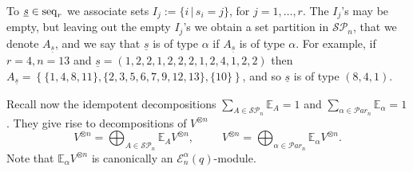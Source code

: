 \documentclass[10pt,a4,twoside,hidelinks,rm]{article}
\newcommand{\seqr}{{\rm seq}_r}
\newcommand{\Par}{{\mathcal Par}_n}
\newcommand{\Ea}{ {\mathcal E}_n^{\alpha}(q)}
\newcommand\be{\mathbb{E}}
\theoremstyle{plain}
\begin{document}
\medskip
To $ \underline{s} \in \seqr $ we associate sets $ I_j :=\{ i \, | \, s_i =j \} $, for $ j=1,\ldots, r$. 
The $I_j$'s may be empty, but leaving out the empty $ I_j$'s we obtain a 
set partition in $ \mathcal{SP}_n $, that we denote $ A_{\underline{s}} $, and we say that $  \underline{s}  $ is of type $ \alpha $ if $ A_{\underline{s}} $
is of type $ \alpha$. For example, if $ r = 4,n=13 $ and $ \underline{s} = (1,2,2,1,2,2,2,1,2,4,1,2,2) $ then
$A_{\underline{s}} = \left\{ \{1,4,8,11\}, \{ 2, 3,5,6,7,9,12,13 \}, \{ 10 \} \right\} $, and so $ \underline{s}$ is
of type $ (8,4,1)$.

\medskip
Recall now the idempotent decompositions $ \sum_{ A \in \mathcal{SP}_n}  \mathbb{E}_A = 1 $
and $ \sum_{\alpha\in\Par }  \mathbb{E}_{\alpha} = 1 $.
They give rise to decompositions of $ V^{\otimes n} $
\begin{equation}\label{103}
  V^{\otimes n} = \bigoplus_{A \in \mathcal{SP}_n } \be_A   V^{\otimes n},\, \, \, \, \, \, \, \, \, \, \, \, \, \, \, 
V^{\otimes n} = \bigoplus_{\alpha\in\Par} \be_\alpha   V^{\otimes n}.
\end{equation}
Note that $ \be_\alpha   V^{\otimes n} $ is canonically an $ \Ea$-module.
\end{document}
